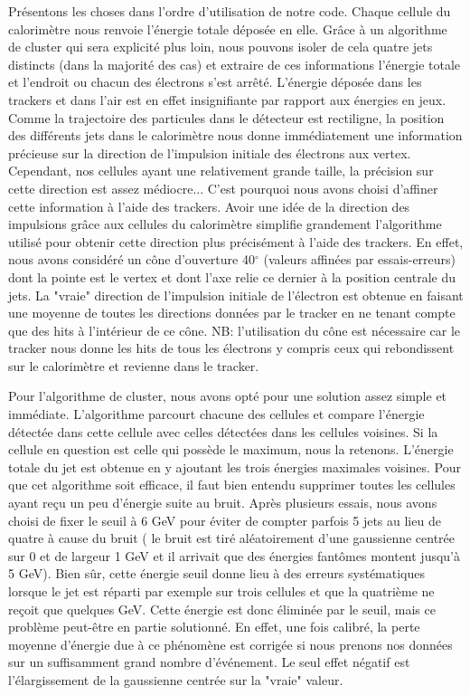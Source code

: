 \documentclass[11pt]{article}
\begin{document}
Présentons les choses dans l'ordre d'utilisation de notre code. Chaque cellule
du calorimètre nous renvoie l'énergie totale déposée en elle. Grâce à un
algorithme de cluster qui sera explicité plus loin, nous pouvons isoler de
cela quatre jets distincts (dans la majorité des cas) et extraire de ces
informations l'énergie totale et l'endroit ou chacun des électrons s'est
arrêté. L'énergie déposée dans les trackers et dans l'air est en effet
insignifiante par rapport aux énergies en jeux. Comme la trajectoire des
particules dans le détecteur est rectiligne, la position des différents jets
dans le calorimètre nous donne immédiatement une information précieuse sur la
direction de l'impulsion initiale des électrons aux
vertex. Cependant, nos cellules ayant une relativement grande taille, la
précision sur cette direction est assez médiocre... C'est pourquoi nous avons
choisi d'affiner cette information à l'aide des trackers. Avoir une idée de la
direction des impulsions grâce aux cellules du calorimètre simplifie
grandement l'algorithme utilisé pour obtenir cette direction plus précisément à
l'aide des trackers. En effet, nous avons considéré un cône d'ouverture
40$^{\circ}$
(valeurs affinées par essais-erreurs) dont la pointe est le vertex et dont l'axe
relie ce dernier à la position centrale du jets. La "vraie" direction de
l'impulsion initiale de l'électron est obtenue en faisant une moyenne de toutes
les directions données par le tracker en ne tenant compte que des hits à
l'intérieur de ce cône. NB: l'utilisation du cône est nécessaire car le tracker
nous donne les hits de tous les électrons y compris ceux qui rebondissent sur
le calorimètre et revienne dans le tracker. 

Pour l'algorithme de cluster, nous avons opté pour une solution assez simple
et immédiate. L'algorithme parcourt chacune des cellules et compare l'énergie
détectée dans cette cellule avec celles détectées dans les cellules voisines.
Si la cellule en question est celle qui possède le maximum, nous la retenons.
L'énergie totale du jet est obtenue en y ajoutant les trois énergies
maximales voisines. Pour que cet algorithme soit efficace, il faut bien entendu
supprimer toutes les cellules ayant reçu un peu d'énergie suite au bruit. Après
plusieurs essais, nous avons choisi de fixer le seuil à 6 GeV pour éviter de
compter parfois 5 jets au lieu de quatre à cause du bruit ( le bruit est tiré
aléatoirement d'une gaussienne centrée sur 0 et de largeur 1 GeV et il arrivait
que des énergies fantômes montent jusqu'à 5 GeV). Bien sûr, cette énergie seuil
donne lieu à des erreurs systématiques lorsque le jet est réparti par exemple
sur trois cellules et que la quatrième ne reçoit que quelques GeV. Cette
énergie est donc éliminée par le seuil, mais ce problème peut-être en partie
solutionné. En effet, une fois calibré, la perte moyenne d'énergie due à ce
phénomène est corrigée si nous prenons nos données sur un suffisamment grand
nombre d'événement. Le seul effet négatif est l'élargissement de la gaussienne
centrée sur la "vraie" valeur. 
\end{document}
